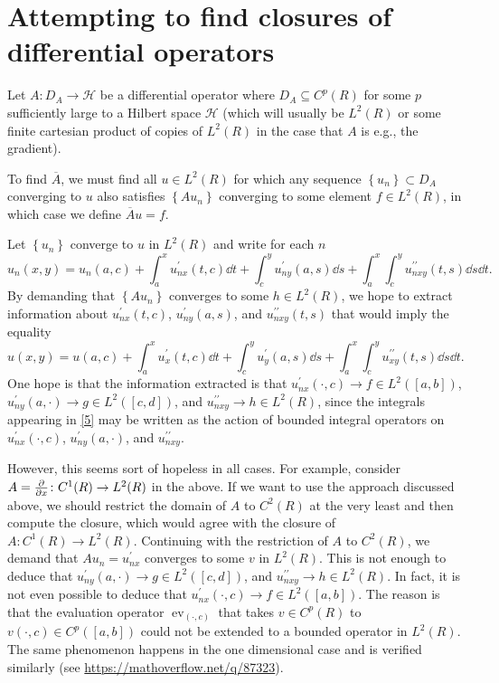 \documentclass[11pt,leqno]{article}
\theoremstyle{plain}
\theoremstyle{definition}
\numberwithin{equation}{section}
\numberwithin{lem}{section}
\newcommand{\cbr}[1]{\left\{#1\right\}}
\DeclareMathOperator{\EV}{ev}
\begin{document}
\section{Attempting to find closures of differential operators}
Let $A\colon D_A\to\mathcal H$ be a differential operator where $D_A\subseteq C^p(R)$ for some $p$ sufficiently large to a Hilbert space $\mathcal H$ (which will usually be $L^2(R)$ or some finite cartesian product of copies of $L^2(R)$ in the case that $A$ is e.g., the gradient).

To find $\overline A$, we must find all $u\in L^2(R)$ for which any sequence $\cbr{u_n}\subset D_A$ converging to $u$ also satisfies $\cbr{Au_n}$ converging to some element $f\in L^2(R)$, in which case we define $\overline{A}u = f$.

Let $\cbr{u_n}$ converge to $u$ in $L^2(R)$ and write for each $n$
\begin{equation}\label{3}
    u_n(x,y) = u_n(a,c) + \int_a^x u^\prime_{nx}(t,c) \dd t + \int_c^y u^\prime_{ny}(a,s)\dd s  + \int_a^x \int_c^y u^{\prime\prime}_{nxy}(t,s)\dd s \dd t.
\end{equation}
By demanding that $\cbr{Au_n}$ converges to some $h\in L^2(R)$, we hope to extract information about $u^\prime_{nx}(t,c)$, $u^\prime_{ny}(a,s)$, and $u^{\prime\prime}_{nxy}(t,s)$ that would imply the equality \begin{equation}\label{5}
    u(x,y) = u(a,c) + \int_a^x u^\prime_x(t,c) \dd t + \int_c^y u^\prime_y(a,s)\dd s  + \int_a^x \int_c^y u^{\prime\prime}_{xy}(t,s)\dd s \dd t.
\end{equation}
One hope is that the information extracted is that $u^\prime_{nx}(\cdot,c)\to f\in L^2([a,b])$, $u^\prime_{ny}(a,\cdot)\to g\in L^2([c,d])$, and $u^{\prime\prime}_{nxy} \to h\in L^2(R)$, since the integrals appearing in \eqref{5} may be written as the action of bounded integral operators on $u^\prime_{nx}(\cdot,c)$, $u^\prime_{ny}(a,\cdot)$, and $u^{\prime\prime}_{nxy}$.

However, this seems sort of hopeless in all cases. For example, consider $A = \pdv x\colon C^1(R)\to L^2(R)$ in the above. If we want to use the approach discussed above, we should restrict the domain of $A$ to $C^2(R)$ at the very least and then compute the closure, which would agree with the closure of $A\colon C^1(R)\to L^2(R)$. Continuing with the restriction of $A$ to $C^2(R)$, we demand that $Au_n = u^\prime_{nx}$ converges to some $v$ in $L^2(R)$. This is not enough to deduce that $u^\prime_{ny}(a,\cdot)\to g\in L^2([c,d])$, and $u^{\prime\prime}_{nxy} \to h\in L^2(R)$. In fact, it is not even possible to deduce that $u^\prime_{nx}(\cdot,c)\to f\in L^2([a,b])$. The reason is that the evaluation operator $\EV_{(\cdot,c)}$ that takes $v\in C^p(R)$ to $v(\cdot,c)\in C^p([a,b])$ could not be extended to a bounded operator in $L^2(R)$. The same phenomenon happens in the one dimensional case and is verified similarly (see \href{https://mathoverflow.net/q/87323}{https://mathoverflow.net/q/87323}).
\end{document}
